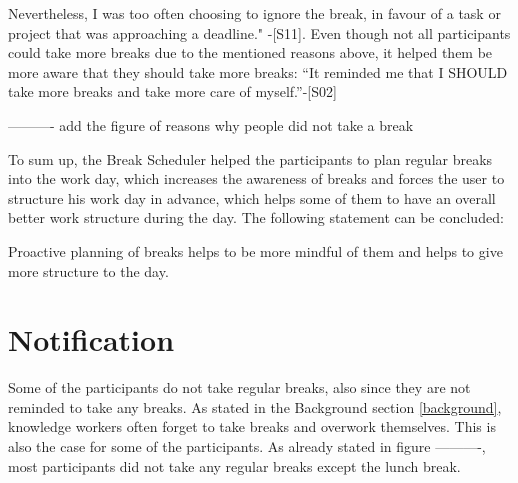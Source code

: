 \documentclass{hasel_thesis}
\begin{document}
Nevertheless, I was too often choosing to ignore the break, in favour of a task or project that was approaching a deadline." -[S11]. Even though not all participants could take more breaks due to the mentioned reasons above, it helped them be more aware that they should take more breaks: “It reminded me that I SHOULD take more breaks and take more care of myself.”-[S02]


 ---------- add the figure of reasons why people did not take a break

To sum up, the Break Scheduler helped the participants to plan regular breaks into the work day, which increases the awareness of breaks and forces the user to structure his work day in advance, which helps some of them to have an overall better work structure during the day. The following statement can be concluded:

\begin{tcolorbox}[colback=white!5!white,colframe=black!75!black]
 Proactive planning of breaks helps to be more mindful of them and helps to give more structure to the day.
\end{tcolorbox}
\section{Notification}

Some of the participants do not take regular breaks, also since they are not reminded to take any breaks. As stated in the Background section \ref{background}, knowledge workers often forget to take breaks and overwork themselves. This is also the case for some of the participants. As already stated in figure ----------, most participants did not take any regular breaks except the lunch break.
\end{document}
